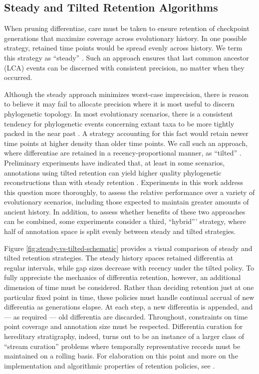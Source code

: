 \subsection{Steady and Tilted Retention Algorithms}



When pruning differentiae, care must be taken to ensure retention of checkpoint generations that maximize coverage across evolutionary history.
In one possible strategy, retained time points would be spread evenly across history.
We term this strategy as ``steady'' \citep{han2005stream,zhao2005generalized}.
Such an approach ensures that last common ancestor (LCA) events can be discerned with consistent precision, no matter when they occurred.

Although the steady approach minimizes worst-case imprecision, there is reason to believe it may fail to allocate precision where it is most useful to discern phylogenetic topology.
In most evolutionary scenarios, there is a consistent tendency for phylogenetic events concerning extant taxa to be more tightly packed in the near past \citep{zhaxybayeva2004cladogenesis}.
A strategy accounting for this fact would retain newer time points at higher density than older time points.
We call such an approach, where differentiae are retained in a recency-proportional manner, as ``tilted'' \citep{han2005stream,zhao2005generalized}.
Preliminary experiments have indicated that, at least in some scenarios, annotations using tilted retention can yield higher quality phylogenetic reconstructions than with steady retention \citep{moreno2022hereditary}.
Experiments in this work address this question more thoroughly, to assess the relative performance over a variety of evolutionary scenarios, including those expected to maintain greater amounts of ancient history.
In addition, to assess whether benefits of these two approaches can be combined, some experiments consider a third, ``hybrid''' strategy, where half of annotation space is split evenly between steady and tilted strategies.

Figure \ref{fig:steady-vs-tilted-schematic} provides a visual comparison of steady and tilted retention strategies.
The steady history spaces retained differentia at regular intervals, while gap sizes decrease with recency under the tilted policy.
To fully appreciate the mechanics of differentia retention, however, an additional dimension of time must be considered.
Rather than deciding retention just at one particular fixed point in time, these policies must handle continual accrual of new differentia as generations elapse.
At each step, a new differentia is appended, and --- as required --- old differentia are discarded.
Throughout, constraints on time point coverage and annotation size must be respected.
Differentia curation for hereditary stratigraphy, indeed, turns out to be an instance of a larger class of ``stream curation'' problems where temporally representative records must be maintained on a rolling basis.
For elaboration on this point and more on the implementation and algorithmic properties of retention policies, see \citet{moreno2024algorithms}.

